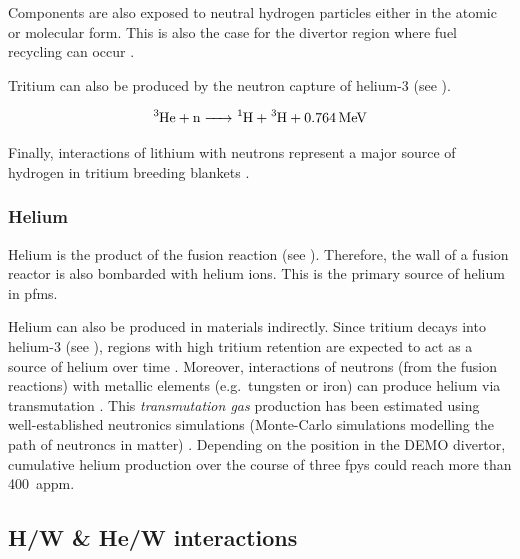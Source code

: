 Components are also exposed to neutral hydrogen particles either in the atomic or molecular form.
This is also the case for the \gls{divertor} region where \gls{fuel recycling} can occur .

Tritium can also be produced by the neutron capture of helium-3  (see ).

\begin{equation}
    \ce{^3He + n -> ^1H + ^3H + \SI{0.764}{MeV}}
    \labeq{he3 neutron capture reaction}
\end{equation}

Finally, interactions of lithium with neutrons represent a major source of hydrogen in tritium \glspl{breeding blanket} .

\subsubsection{Helium}
Helium is the product of the fusion reaction (see ).
Therefore, the wall of a fusion reactor is also bombarded with helium ions.
This is the primary source of helium in \glspl{pfm}.

Helium can also be produced in materials indirectly.
Since tritium decays into helium-3 (see ), regions with high tritium \gls{retention} are expected to act as a source of helium over time \cite{shimada_tritium_2017}.
Moreover, interactions of neutrons (from the fusion reactions) with metallic elements (e.g.\ tungsten or iron) can produce helium via transmutation .
This \emph{\gls{transmutation gas}} production has been estimated using well-established neutronics simulations (Monte-Carlo simulations modelling the path of neutroncs in matter) .
Depending on the position in the DEMO \gls{divertor}, cumulative helium production over the course of three \glspl{fpy} could reach more than \SI{400}{appm}.


\subsection{H/W \& He/W interactions}


